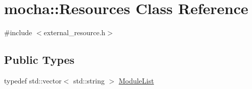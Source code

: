 \hypertarget{classmocha_1_1_resources}{
\section{mocha::Resources Class Reference}
\label{classmocha_1_1_resources}
}


{\ttfamily \#include $<$external\_\-resource.h$>$}

\subsection*{Public Types}
\begin{DoxyCompactItemize}
\item 
typedef std::vector$<$ std::string $>$ \hyperlink{classmocha_1_1_resources_aad639c8977988cfb76e0f7bd52a01f12}{ModuleList}
\end{DoxyCompactItemize}
